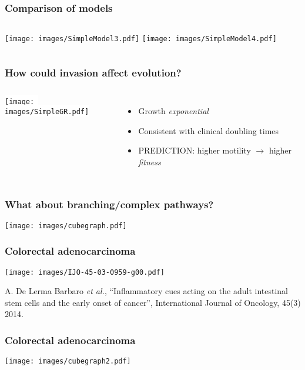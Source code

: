 \documentclass{beamer}
\begin{document}
\begin{frame}
\frametitle{Comparison of models}
    \begin{columns}[c]
        \texttt{[image: images/SimpleModel3.pdf]} 
        \texttt{[image: images/SimpleModel4.pdf]} 
    \end{columns}
\end{frame}

\begin{frame}
\frametitle{How could invasion affect evolution?}
\begin{columns}[c]
    \colorbox{white}{\texttt{[image: images/SimpleGR.pdf]} }
    \begin{itemize}
        \item Growth \emph{exponential}
        \item Consistent with clinical doubling times
        \item PREDICTION: higher motility $\rightarrow$ higher \emph{fitness}
    \end{itemize}
\end{columns}
\end{frame}

\begin{frame}
    \frametitle{What about branching/complex pathways?}

    \begin{center}
    \texttt{[image: images/cubegraph.pdf]}
    \end{center}
\end{frame}

\begin{frame}
    \frametitle{Colorectal adenocarcinoma}

    \begin{center}
    \texttt{[image: images/IJO-45-03-0959-g00.pdf]}
    \end{center}

    \tiny{A. De Lerma Barbaro \emph{et al.}, ``Inflammatory cues acting on the adult
    intestinal stem cells and the early onset of cancer'', International
    Journal of Oncology, 45(3) 2014.}
\end{frame}

\begin{frame}
    \frametitle{Colorectal adenocarcinoma}

    \begin{center}
    \texttt{[image: images/cubegraph2.pdf]}
    \end{center}

\end{frame}
\end{document}
